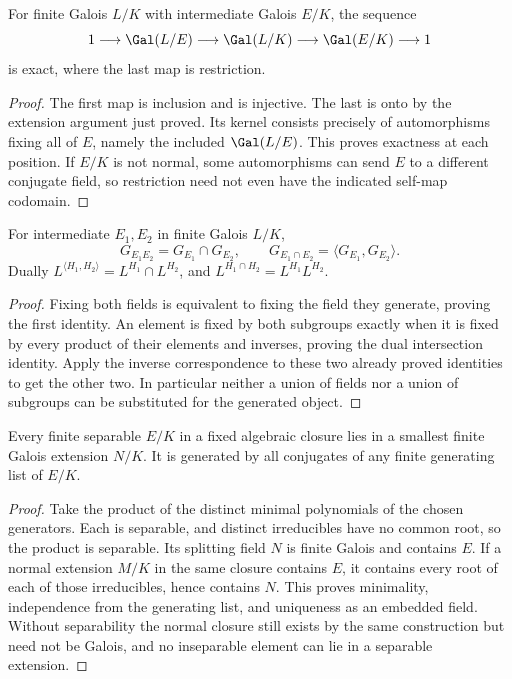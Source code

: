 \begin{corollary}
For finite Galois $L/K$ with intermediate Galois $E/K$, the sequence
\[1\longrightarrow\Gal(L/E)\longrightarrow\Gal(L/K)
 \longrightarrow\Gal(E/K)\longrightarrow1\]
is exact, where the last map is restriction.
\end{corollary}
\begin{proof}
The first map is inclusion and is injective. The last is onto by the extension argument just proved. Its kernel consists precisely of automorphisms fixing all of $E$, namely the included $\Gal(L/E)$. This proves exactness at each position. If $E/K$ is not normal, some automorphisms can send $E$ to a different conjugate field, so restriction need not even have the indicated self-map codomain.
\end{proof}

\begin{proposition}
For intermediate $E_1,E_2$ in finite Galois $L/K$,
\[G_{E_1E_2}=G_{E_1}\cap G_{E_2},\qquad
G_{E_1\cap E_2}=\langle G_{E_1},G_{E_2}\rangle.\]
Dually $L^{\langle H_1,H_2\rangle}=L^{H_1}\cap L^{H_2}$, and $L^{H_1\cap H_2}=L^{H_1}L^{H_2}$.
\end{proposition}
\begin{proof}
Fixing both fields is equivalent to fixing the field they generate, proving the first identity. An element is fixed by both subgroups exactly when it is fixed by every product of their elements and inverses, proving the dual intersection identity. Apply the inverse correspondence to these two already proved identities to get the other two. In particular neither a union of fields nor a union of subgroups can be substituted for the generated object.
\end{proof}

\begin{theorem}
Every finite separable $E/K$ in a fixed algebraic closure lies in a smallest finite Galois extension $N/K$. It is generated by all conjugates of any finite generating list of $E/K$.
\end{theorem}
\begin{proof}
Take the product of the distinct minimal polynomials of the chosen generators. Each is separable, and distinct irreducibles have no common root, so the product is separable. Its splitting field $N$ is finite Galois and contains $E$. If a normal extension $M/K$ in the same closure contains $E$, it contains every root of each of those irreducibles, hence contains $N$. This proves minimality, independence from the generating list, and uniqueness as an embedded field. Without separability the normal closure still exists by the same construction but need not be Galois, and no inseparable element can lie in a separable extension.
\end{proof}

